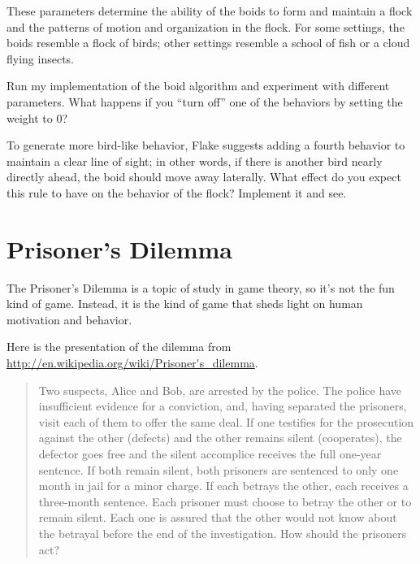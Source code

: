 \documentclass[10pt]{book}
\begin{document}
These parameters determine the ability of the boids to form and
maintain a flock and the patterns of motion and organization in the
flock.  For some settings, the boids resemble a flock of birds; other
settings resemble a school of fish or a cloud flying insects.

\begin{ex}


Run my implementation of the boid algorithm and experiment with
different parameters.  What happens if you ``turn off'' one
of the behaviors by setting the weight to 0?

To generate more bird-like behavior, 
Flake suggests adding a fourth behavior to maintain a clear
line of sight; in other words, if there is another bird nearly
directly ahead, the boid should move away laterally.  What effect
do you expect this rule to have on the behavior of the flock?
Implement it and see.

\end{ex}


\section{Prisoner's Dilemma}

The Prisoner's Dilemma is a topic of study in game theory, so
it's not the fun kind of game.  Instead, it is the kind of game
that sheds light on human motivation and behavior.

Here is the presentation of the dilemma from
\url{http://en.wikipedia.org/wiki/Prisoner's_dilemma}.

\begin{quote}
Two suspects, Alice and Bob, are arrested by the police.  The police
have insufficient evidence for a conviction, and, having separated the
prisoners, visit each of them to offer the same deal.  If one
testifies for the prosecution against the other (defects) and the
other remains silent (cooperates), the defector goes free and the
silent accomplice receives the full one-year sentence.  If both remain
silent, both prisoners are sentenced to only one month in jail for a
minor charge. If each betrays the other, each receives a three-month
sentence. Each prisoner must choose to betray the other or to remain
silent. Each one is assured that the other would not know about the
betrayal before the end of the investigation.  How should the
prisoners act?
\end{quote}
\end{document}
